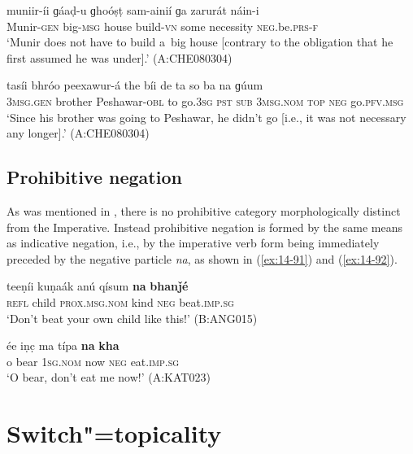\begin{exe}
\ex
\label{ex:14-89}
\gll muniir-íi ɡáaḍ-u ɡhoóṣṭ sam-ainií ɡa zarurát  náin-i \\
Munir-\textsc{gen} big-\textsc{msg} house build-\textsc{vn} some necessity  \textsc{neg.}be.\textsc{prs}-\textsc{f } \\
\glt `Munir does not have to build a~big house [contrary to the obligation that he first assumed he was under].' (A:CHE080304)

\ex
\label{ex:14-90}
\gll tasíi bhróo peexawur-á the bíi de ta so ba na ɡúum \\
\textsc{3msg}.\textsc{gen} brother Peshawar-\textsc{obl} to go.\textsc{3sg} \textsc{pst} \textsc{sub}  \textsc{3msg.nom} \textsc{top} \textsc{neg} go.\textsc{pfv.msg } \\
\glt `Since his brother was going to Peshawar, he didn't go [i.e., it was not necessary any longer].' (A:CHE080304)
\end{exe}

\subsection{Prohibitive negation}
\label{subsec:14-3-5}


As was mentioned in , there is no prohibitive category morphologically distinct from the Imperative. Instead prohibitive negation is formed by the same means as indicative negation, i.e., by the imperative verb form being immediately preceded by the negative particle \textit{na}, as shown in (\ref{ex:14-91}) and (\ref{ex:14-92}).

\begin{exe}
\ex
\label{ex:14-91}
\gll teeṇíi kuṇaák anú qísum \textbf{na} \textbf{bhanǰé} \\
\textsc{refl} child \textsc{prox.msg.nom} kind \textsc{neg} beat.\textsc{imp.sg}  \\
\glt `Don't beat your own child like this!' (B:ANG015)

\ex
\label{ex:14-92}
\gll ée iṇc̣ ma típa \textbf{na} \textbf{kha} \\
o bear \textsc{1sg.nom} now \textsc{neg} eat.\textsc{imp.sg } \\
\glt `O bear, don't eat me now!' (A:KAT023)
\end{exe}

\section{Switch"=topicality}
\label{sec:14-4}


